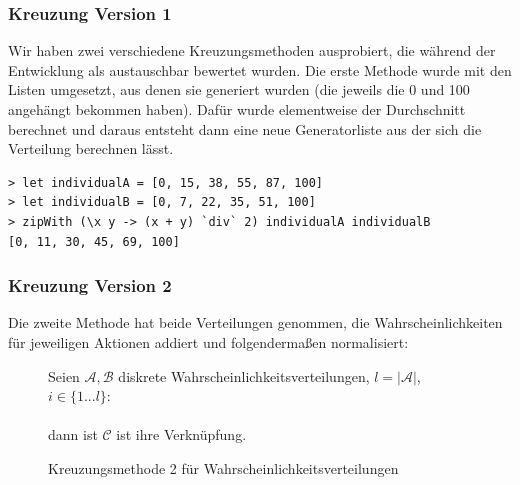             \subsubsection*{Kreuzung Version 1}
            Wir haben zwei verschiedene Kreuzungsmethoden ausprobiert, die während der Entwicklung als austauschbar bewertet wurden. Die erste Methode wurde mit den Listen umgesetzt, aus denen sie generiert wurden (die jeweils die 0 und 100 angehängt bekommen haben). Dafür wurde elementweise der Durchschnitt berechnet und daraus entsteht dann eine neue Generatorliste aus der sich die Verteilung berechnen lässt.
            \begin{mdframed}
            \begin{verbatim}
> let individualA = [0, 15, 38, 55, 87, 100]
> let individualB = [0, 7, 22, 35, 51, 100]
> zipWith (\x y -> (x + y) `div` 2) individualA individualB
[0, 11, 30, 45, 69, 100]
            \end{verbatim}
            \end{mdframed}
            \subsubsection*{Kreuzung Version 2}
            Die zweite Methode hat beide Verteilungen genommen, die Wahrscheinlichkeiten für jeweiligen Aktionen addiert und folgendermaßen normalisiert:\\
            \noindent
            \begin{figure}[H]
                \begin{mdframed}
                    Seien $\mathcal{A, B}$ diskrete Wahrscheinlichkeitsverteilungen, $l = |\mathcal{A}|$, $i \in \{1 ... l\}$:\\[4mm]
                    \hspace*{40mm} \\[4mm]
                    dann ist $\mathcal{C}$ ist ihre Verknüpfung.
                \end{mdframed}
                \renewcommand{\figurename}{Definition}
                \caption{\label{norm-prop} Kreuzungsmethode 2 für Wahrscheinlichkeitsverteilungen}
            \end{figure}

